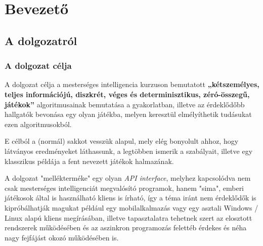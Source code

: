 \documentclass[twoside, a4paper, 12pt]{book}
\begin{document}
\part{Bevezető}
\chapter{A dolgozatról}
\section{A dolgozat célja}
A dolgozat célja a mesterséges intelligencia kurzuson bemutatott \textbf{„kétszemélyes, teljes információjú, diszkrét, véges és determinisztikus, zéró-összegű, játékok”} algoritmusainak bemutatása a gyakorlatban, illetve az érdeklődőbb hallgatók bevonása egy olyan játékba, melyen keresztül elmélyíthetik tudásukat ezen algoritmusokból.

E célból a (normál) sakkot vesszük alapul, mely elég bonyolult ahhoz, hogy látványos eredményeket láthassunk, a legtöbben ismerik a szabályait, illetve egy klasszikus példája a fent nevezett játékok halmazának.

A dolgozat "mellékterméke" egy olyan \textit{API interface}, melyhez kapcsolódva nem csak mesterséges intelligenciát megvalósító programok, hanem "sima", emberi játékosok által is használható kliens is írható, így a téma iránt nem érdeklődők is kipróbálhatják magukat például egy mobilalkalmazás vagy egy asztali Windows / Linux alapú kliens megírásában, illetve tapasztalatra tehetnek szert az elosztott rendszerek működésében és az aszinkron programozás felettéb érdekes és néha nagy fejfájást okozó működésében is.
\end{document}
